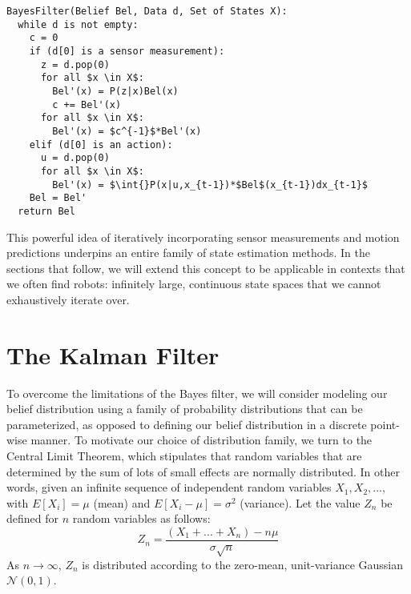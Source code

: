 \begin{Verbatim}[commandchars=\\\{\}, codes={\catcode`$=3\catcode`^=7\catcode`_=8}]
BayesFilter(Belief Bel, Data d, Set of States X):
  while d is not empty:
    c = 0
    if (d[0] is a sensor measurement):
      z = d.pop(0)
      for all $x \in X$:
        Bel'(x) = P(z|x)Bel(x)
        c += Bel'(x)
      for all $x \in X$:
        Bel'(x) = $c^{-1}$*Bel'(x)
    elif (d[0] is an action):
      u = d.pop(0)
      for all $x \in X$:
        Bel'(x) = $\int{}P(x|u,x_{t-1})*$Bel$(x_{t-1})dx_{t-1}$
    Bel = Bel'
  return Bel
\end{Verbatim}

This powerful idea of iteratively incorporating sensor measurements and motion predictions underpins an entire family of state estimation methods. In the sections that follow, we will extend this concept to be applicable in contexts that we often find robots: infinitely large, continuous state spaces that we cannot exhaustively iterate over.

\section{The Kalman Filter}
To overcome the limitations of the Bayes filter, we will consider modeling our belief distribution using a family of probability distributions that can be parameterized, as opposed to defining our belief distribution in a discrete point-wise manner. To motivate our choice of distribution family, we turn to the Central Limit Theorem, which stipulates that random variables that are determined by the sum of lots of small effects are normally distributed. In other words, given an infinite sequence of independent random variables $X_1, X_2, ...$, with $E[X_i]=\mu$ (mean) and $E[X_i-\mu]=\sigma^2$ (variance). Let the value $Z_n$ be defined for $n$ random variables as follows:
$$
Z_n = \frac{(X_1+...+X_n)-n\mu}{\sigma\sqrt{n}}
$$
As $n\rightarrow \infty$, $Z_n$ is distributed according to the zero-mean, unit-variance Gaussian 
$\mathcal{N}(0,1)$.\\
